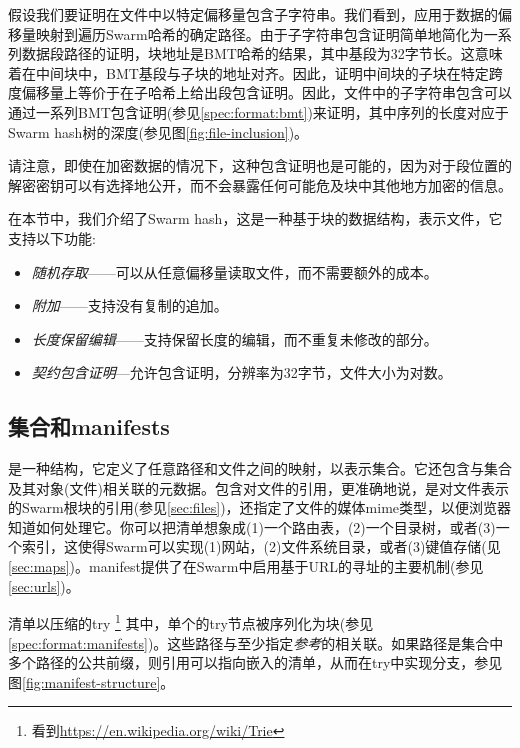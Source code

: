 假设我们要证明在文件中以特定偏移量包含子字符串。我们看到，应用于数据的偏移量映射到遍历Swarm哈希的确定路径。由于子字符串包含证明简单地简化为一系列数据段路径的证明，块地址是BMT哈希的结果，其中基段为32字节长。这意味着在中间块中，BMT基段与子块的地址对齐。因此，证明中间块的子块在特定跨度偏移量上等价于在子哈希上给出段包含证明。因此，文件中的子字符串包含可以通过一系列BMT包含证明(参见\ref{spec:format:bmt})来证明，其中序列的长度对应于Swarm hash树的深度(参见图\ref{fig:file-inclusion})。


请注意，即使在加密数据的情况下，这种包含证明也是可能的，因为对于段位置的解密密钥可以有选择地公开，而不会暴露任何可能危及块中其他地方加密的信息。

在本节中，我们介绍了Swarm hash，这是一种基于块的数据结构，表示文件，它支持以下功能:

\begin{itemize}
    \item \emph{随机存取}——可以从任意偏移量读取文件，而不需要额外的成本。
    \item \emph{附加}——支持没有复制的追加。 
    \item \emph{长度保留编辑}——支持保留长度的编辑，而不重复未修改的部分。
    \item \emph{契约包含证明}—允许包含证明，分辨率为32字节，文件大小为对数。
\end{itemize}



\subsection{集合和manifests\statusgreen}\label{sec:collections}

是一种结构，它定义了任意路径和文件之间的映射，以表示集合。它还包含与集合及其对象(文件)相关联的元数据。包含对文件的引用，更准确地说，是对文件表示的Swarm根块的引用(参见\ref{sec:files})，还指定了文件的媒体mime类型，以便浏览器知道如何处理它。你可以把清单想象成(1)一个路由表，(2)一个目录树，或者(3)一个索引，这使得Swarm可以实现(1)网站，(2)文件系统目录，或者(3)键值存储(见\ref{sec:maps})。manifest提供了在Swarm中启用基于URL的寻址的主要机制(参见\ref{sec:urls})。

清单以压缩的try %
%
\footnote{看到\url{https://en.wikipedia.org/wiki/Trie}}
%
其中，单个的try节点被序列化为块(参见\ref{spec:format:manifests})。这些路径与至少指定\emph{参考}的相关联。如果路径是集合中多个路径的公共前缀，则引用可以指向嵌入的清单，从而在try中实现分支，参见图\ref{fig:manifest-structure}。 


